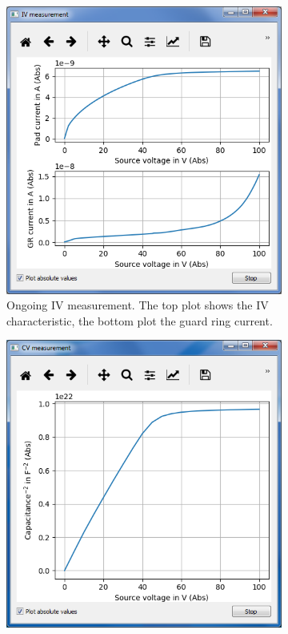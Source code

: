 \documentclass[a4paper]{article}
\begin{document}
\begin{figure}[hbtp]
\centering
\begin{subfigure}[t]{0.475\textwidth}
\centering\captionsetup{width=.8\linewidth}%
\includegraphics[width=\linewidth]{pictures/ivmeas.png}
\caption[Running IV Measurement]{Ongoing IV measurement. The top plot shows the IV characteristic, the bottom plot the guard ring current.}
\label{fig:ivmeas}
\end{subfigure}
\begin{subfigure}[t]{0.475\textwidth}
\centering\captionsetup{width=.8\linewidth}%
\includegraphics[width=\linewidth]{pictures/cvmeas.png}

\end{subfigure}
\end{figure}
\end{document}
